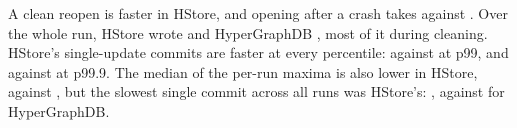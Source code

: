 A clean reopen is  faster in HStore, and opening after a crash takes  against . Over the whole run, HStore wrote  and HyperGraphDB , most of it during cleaning. HStore's single-update commits are faster at every percentile:  against  at p99, and  against  at p99.9. The median of the per-run maxima is also lower in HStore,  against , but the slowest single commit across all runs was HStore's: , against  for HyperGraphDB.


